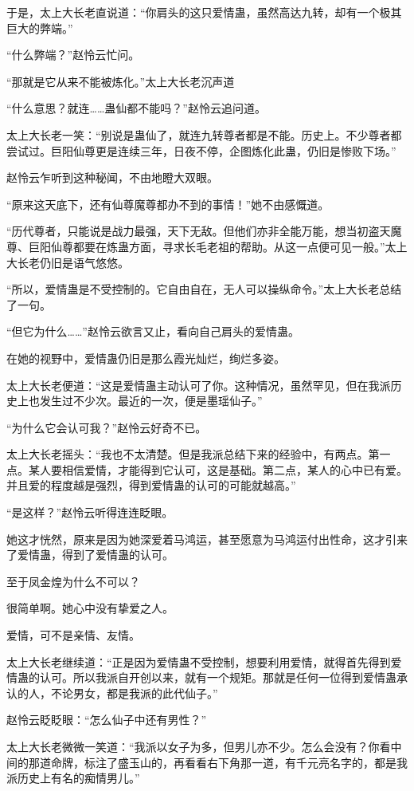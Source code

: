 \begin{this_body}
于是，太上大长老直说道：“你肩头的这只爱情蛊，虽然高达九转，却有一个极其巨大的弊端。”

“什么弊端？”赵怜云忙问。

“那就是它从来不能被炼化。”太上大长老沉声道

“什么意思？就连……蛊仙都不能吗？”赵怜云追问道。

太上大长老一笑：“别说是蛊仙了，就连九转尊者都是不能。历史上。不少尊者都尝试过。巨阳仙尊更是连续三年，日夜不停，企图炼化此蛊，仍旧是惨败下场。”

赵怜云乍听到这种秘闻，不由地瞪大双眼。

“原来这天底下，还有仙尊魔尊都办不到的事情！”她不由感慨道。

“历代尊者，只能说是战力最强，天下无敌。但他们亦非全能万能，想当初盗天魔尊、巨阳仙尊都要在炼蛊方面，寻求长毛老祖的帮助。从这一点便可见一般。”太上大长老仍旧是语气悠悠。

“所以，爱情蛊是不受控制的。它自由自在，无人可以操纵命令。”太上大长老总结了一句。

“但它为什么……”赵怜云欲言又止，看向自己肩头的爱情蛊。

在她的视野中，爱情蛊仍旧是那么霞光灿烂，绚烂多姿。

太上大长老便道：“这是爱情蛊主动认可了你。这种情况，虽然罕见，但在我派历史上也发生过不少次。最近的一次，便是墨瑶仙子。”

“为什么它会认可我？”赵怜云好奇不已。

太上大长老摇头：“我也不太清楚。但是我派总结下来的经验中，有两点。第一点。某人要相信爱情，才能得到它认可，这是基础。第二点，某人的心中已有爱。并且爱的程度越是强烈，得到爱情蛊的认可的可能就越高。”

“是这样？”赵怜云听得连连眨眼。

她这才恍然，原来是因为她深爱着马鸿运，甚至愿意为马鸿运付出性命，这才引来了爱情蛊，得到了爱情蛊的认可。

至于凤金煌为什么不可以？

很简单啊。她心中没有挚爱之人。

爱情，可不是亲情、友情。

太上大长老继续道：“正是因为爱情蛊不受控制，想要利用爱情，就得首先得到爱情蛊的认可。所以我派自开创以来，就有一个规矩。那就是任何一位得到爱情蛊承认的人，不论男女，都是我派的此代仙子。”

赵怜云眨眨眼：“怎么仙子中还有男性？”

太上大长老微微一笑道：“我派以女子为多，但男儿亦不少。怎么会没有？你看中间的那道命牌，标注了盛玉山的，再看看右下角那一道，有千元亮名字的，都是我派历史上有名的痴情男儿。”


\end{this_body}
